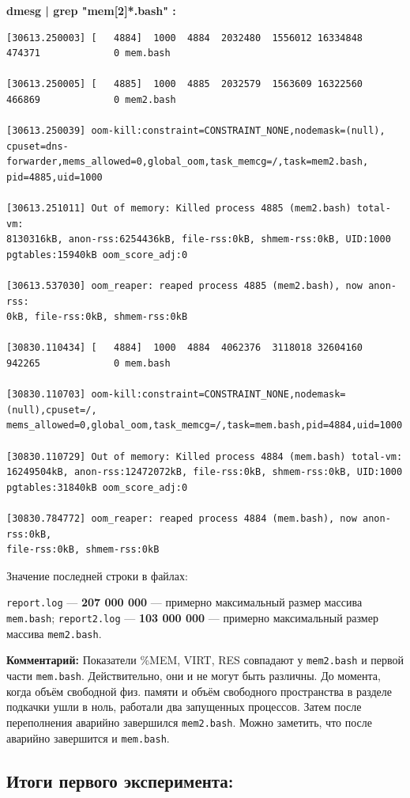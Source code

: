 \documentclass[10pt, a4paper]{article}
\begin{document}
\textbf{dmesg | grep "mem[2]*.bash" :}
\begin{lstlisting}
[30613.250003] [   4884]  1000  4884  2032480  1556012 16334848   474371             0 mem.bash

[30613.250005] [   4885]  1000  4885  2032579  1563609 16322560   466869             0 mem2.bash

[30613.250039] oom-kill:constraint=CONSTRAINT_NONE,nodemask=(null),
cpuset=dns-forwarder,mems_allowed=0,global_oom,task_memcg=/,task=mem2.bash,
pid=4885,uid=1000

[30613.251011] Out of memory: Killed process 4885 (mem2.bash) total-vm:
8130316kB, anon-rss:6254436kB, file-rss:0kB, shmem-rss:0kB, UID:1000 
pgtables:15940kB oom_score_adj:0

[30613.537030] oom_reaper: reaped process 4885 (mem2.bash), now anon-rss:
0kB, file-rss:0kB, shmem-rss:0kB

[30830.110434] [   4884]  1000  4884  4062376  3118018 32604160   942265             0 mem.bash

[30830.110703] oom-kill:constraint=CONSTRAINT_NONE,nodemask=(null),cpuset=/,
mems_allowed=0,global_oom,task_memcg=/,task=mem.bash,pid=4884,uid=1000

[30830.110729] Out of memory: Killed process 4884 (mem.bash) total-vm:
16249504kB, anon-rss:12472072kB, file-rss:0kB, shmem-rss:0kB, UID:1000 
pgtables:31840kB oom_score_adj:0

[30830.784772] oom_reaper: reaped process 4884 (mem.bash), now anon-rss:0kB, 
file-rss:0kB, shmem-rss:0kB
\end{lstlisting}


Значение последней строки в файлах: 

\texttt{report.log} --- \textbf{207 000 000} --- примерно максимальный размер массива \texttt{mem.bash}; 
\texttt{report2.log} --- \textbf{103 000 000} --- примерно максимальный размер массива \texttt{mem2.bash}.

\textbf{Комментарий: }
Показатели \%MEM, VIRT, RES совпадают у \texttt{mem2.bash} и первой части \texttt{mem.bash}. Действительно, они и не могут быть различны. До момента, когда объём свободной физ. памяти и объём свободного пространства в разделе подкачки ушли в ноль, работали два запущенных процессов. Затем после переполнения аварийно завершился \texttt{mem2.bash}. Можно заметить, что после аварийно завершится и \texttt{mem.bash}.

\subsection*{Итоги первого эксперимента: }
\end{document}
